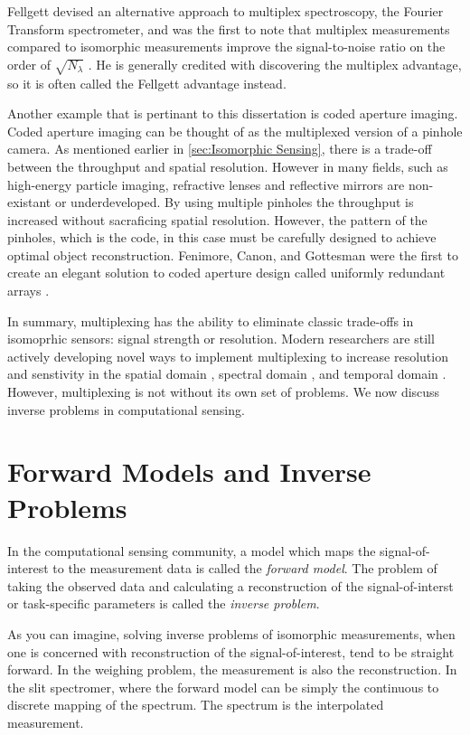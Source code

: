 Fellgett devised an alternative approach to multiplex spectroscopy, the Fourier Transform spectrometer, and was the first to note that multiplex measurements compared to isomorphic measurements improve the signal-to-noise ratio on the order of $ \sqrt{N_{\lambda}}$ \cite{fellgett1958principes}. He is generally credited with discovering the multiplex advantage, so it is often called the Fellgett advantage instead.

Another example that is pertinant to this dissertation is coded aperture imaging. Coded aperture imaging can be thought of as the multiplexed version of a pinhole camera. As mentioned earlier in \autoref{sec:Isomorphic Sensing}, there is a trade-off between the throughput and spatial resolution. However in many fields, such as high-energy particle imaging, refractive lenses and reflective mirrors are non-existant or underdeveloped. By using multiple pinholes the throughput is increased without sacraficing spatial resolution. However, the pattern of the pinholes, which is the code, in this case must be carefully designed to achieve optimal object reconstruction. Fenimore, Canon, and Gottesman were the first to create an elegant solution to coded aperture design called uniformly redundant arrays \cite{fenimore1978coded, gottesman1989new}.

In summary, multiplexing has the ability to eliminate classic trade-offs in isomoprhic sensors: signal strength or resolution. Modern researchers are still actively developing novel ways to implement multiplexing to increase resolution and senstivity in the spatial domain \cite{duarte2008single, townsend2012static}, spectral domain \cite{gehm2006static, tsai2013coded}, and temporal domain \cite{holloway2012flutter,llull2013coded}. However, multiplexing is not without its own set of problems. We now discuss inverse problems in computational sensing.

\section{Forward Models and Inverse Problems}

In the computational sensing community, a model which maps the signal-of-interest to the measurement data is called the \emph{forward model}. The problem of taking the observed data and calculating a reconstruction of the signal-of-interst or task-specific parameters is called the \emph{inverse problem}.

As you can imagine, solving inverse problems of isomorphic measurements, when one is concerned with reconstruction of the signal-of-interest, tend to be straight forward. In the weighing problem, the measurement is also the reconstruction. In the slit spectromer, where the forward model can be simply the continuous to discrete mapping of the spectrum. The spectrum is the interpolated measurement. 

